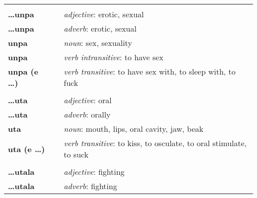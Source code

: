 \begin{supertabular}{p{2,5cm}|ll}
                                 &  &                                                                                                            \\ %
    \textbf{\dots unpa}          &  & \textit{adjective}: erotic, sexual                                                                         \\
    \textbf{\dots unpa}          &  & \textit{adverb}: erotic, sexual                                                                            \\
    \textbf{unpa}                &  & \textit{noun}: sex, sexuality                                                                              \\
    \textbf{unpa}                &  & \textit{verb intransitive}: to have sex                                                                    \\
    \textbf{unpa (e \dots)}      &  & \textit{verb transitive}: to have sex with, to sleep with, to fuck                                         \\
                                 &  &                                                                                                            \\ %
    \textbf{\dots uta}           &  & \textit{adjective}: oral                                                                                   \\
    \textbf{\dots uta}           &  & \textit{adverb}: orally                                                                                    \\
    \textbf{uta}                 &  & \textit{noun}: mouth, lips, oral cavity, jaw, beak                                                         \\
    \textbf{uta (e \dots)}       &  & \textit{verb transitive}: to kiss, to osculate, to oral stimulate, to suck                                 \\
                                 &  &                                                                                                            \\ %
    \textbf{\dots utala}         &  & \textit{adjective}: fighting                                                                               \\
    \textbf{\dots utala}         &  & \textit{adverb}: fighting                                                                                  \\

\end{supertabular}
